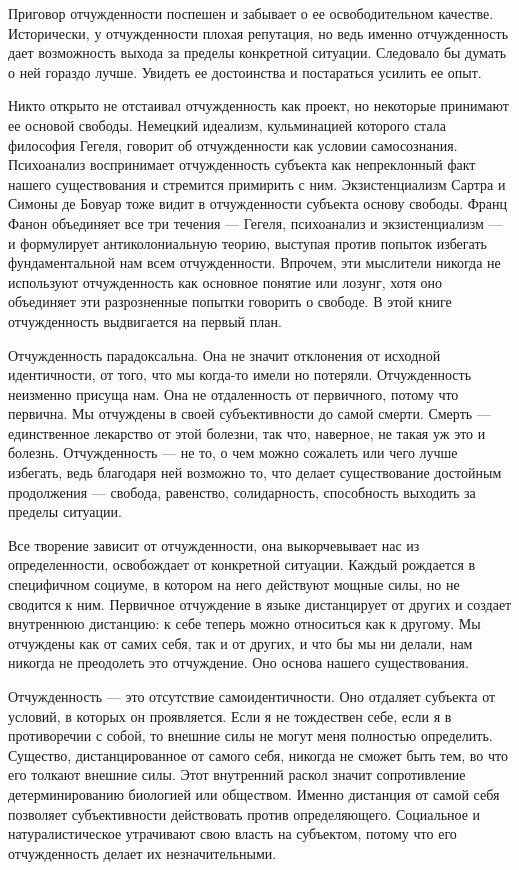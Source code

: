 \documentclass[11pt]{book}
\begin{document}
Приговор отчужденности поспешен и забывает о ее освободительном качестве. Исторически, у отчужденности плохая репутация, но ведь именно отчужденность дает возможность выхода за пределы конкретной ситуации. Следовало бы думать о ней гораздо лучше. Увидеть ее достоинства и постараться усилить ее опыт.

Никто открыто не отстаивал отчужденность как проект, но некоторые принимают ее основой свободы. Немецкий идеализм, кульминацией которого стала философия Гегеля, говорит об отчужденности как условии самосознания. Психоанализ воспринимает отчужденность субъекта как непреклонный факт нашего существования и стремится примирить с ним. Экзистенциализм Сартра и Симоны де Бовуар тоже видит в отчужденности субъекта основу свободы. Франц Фанон объединяет все три течения --- Гегеля, психоанализ и экзистенциализм --- и формулирует антиколониальную теорию, выступая против попыток избегать фундаментальной нам всем отчужденности. Впрочем, эти мыслители никогда не используют отчужденность как основное понятие или лозунг, хотя оно объединяет эти разрозненные попытки говорить о свободе. В этой книге отчужденность выдвигается на первый план.

Отчужденность парадоксальна. Она не значит отклонения от исходной идентичности, от того, что мы когда-то имели но потеряли. Отчужденность неизменно присуща нам. Она не отдаленность от первичного, потому что первична. Мы отчуждены в своей субъективности до самой смерти. Смерть --- единственное лекарство от этой болезни, так что, наверное, не такая уж это и болезнь. Отчужденность --- не то, о чем можно сожалеть или чего лучше избегать, ведь благодаря ней возможно то, что делает существование достойным продолжения --- свобода, равенство, солидарность, способность выходить за пределы ситуации.

Все творение зависит от отчужденности, она выкорчевывает нас из определенности, освобождает от конкретной ситуации. Каждый рождается в специфичном социуме, в котором на него действуют мощные силы, но не сводится к ним. Первичное отчуждение в языке дистанцирует от других и создает внутреннюю дистанцию: к себе теперь можно относиться как к другому. Мы отчуждены как от самих себя, так и от других, и что бы мы ни делали, нам никогда не преодолеть это отчуждение. Оно основа нашего существования.

Отчужденность --- это отсутствие самоидентичности. Оно отдаляет субъекта от условий, в которых он проявляется. Если я не тождествен себе, если я в противоречии с собой, то внешние силы не могут меня полностью определить. Существо, дистанцированное от самого себя, никогда не сможет быть тем, во что его толкают внешние силы. Этот внутренний раскол значит сопротивление детерминированию биологией или обществом. Именно дистанция от самой себя позволяет субъективности действовать против определяющего. Социальное и натуралистическое утрачивают свою власть на субъектом, потому что его отчужденность делает их незначительными.
\end{document}
